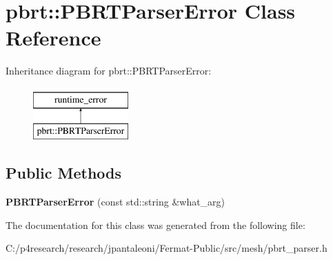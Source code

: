 \hypertarget{classpbrt_1_1_p_b_r_t_parser_error}{}\section{pbrt\+:\+:P\+B\+R\+T\+Parser\+Error Class Reference}
\label{classpbrt_1_1_p_b_r_t_parser_error}
Inheritance diagram for pbrt\+:\+:P\+B\+R\+T\+Parser\+Error\+:\begin{figure}[H]
\begin{center}
\leavevmode
\includegraphics[height=2.000000cm]{classpbrt_1_1_p_b_r_t_parser_error}
\end{center}
\end{figure}
\subsection*{Public Methods}
\begin{DoxyCompactItemize}
\item 
\mbox{\label{classpbrt_1_1_p_b_r_t_parser_error_a8df4c565323f1b33a344039172445e50}} 
{\bfseries P\+B\+R\+T\+Parser\+Error} (const std\+::string \&what\+\_\+arg)
\end{DoxyCompactItemize}


The documentation for this class was generated from the following file\+:\begin{DoxyCompactItemize}
\item 
C\+:/p4research/research/jpantaleoni/\+Fermat-\/\+Public/src/mesh/pbrt\+\_\+parser.\+h\end{DoxyCompactItemize}
